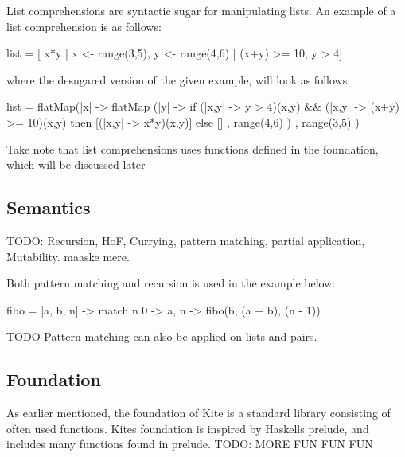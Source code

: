 \label{sec:ex-listcomp}
List comprehensions are syntactic sugar for manipulating
lists. An example of a list comprehension is as follows:
\begin{kite}
  
  list = [ x*y | x <- range(3,5), y <- range(4,6) | (x+y) >= 10, y > 4]
\end{kite}
where the desugared version of the given example, will look as follows:
\begin{kite}

  list =
  flatMap(|x| -> {
    flatMap (|y| -> {
      if (|x,y| -> {y > 4})(x,y) && (|x,y| -> {(x+y) >= 10})(x,y) 
         then [(|x,y| -> {x*y})(x,y)] 
         else []
    } , range(4,6) )
}, range(3,5) )
\end{kite}
Take note that list comprehensions uses functions defined in the
foundation, which will be discussed later
\subsection{Semantics}

TODO: Recursion, HoF, Currying, pattern matching,
partial application, Mutability. maaske mere.

Both pattern matching and recursion is used in the example below:
\begin{kite}

fibo = |a, b, n| -> {
    match n {
    0 -> a,
    n -> fibo(b, (a + b), (n - 1))
    }
}
\end{kite}

TODO Pattern matching can also be applied on lists and pairs.

\subsection{Foundation}

As earlier mentioned, the foundation of Kite is a standard library
consisting of often used functions. Kites foundation is inspired by
Haskells prelude, and includes many functions found in prelude.
TODO: MORE FUN FUN FUN

